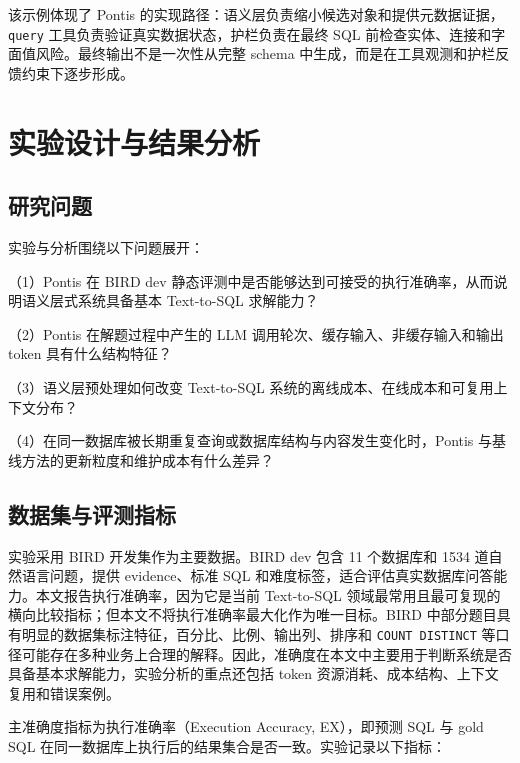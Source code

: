 \documentclass[
    bachelor,
    pdflinks,
]{xjtuthesis}
\begin{document}
该示例体现了 Pontis 的实现路径：语义层负责缩小候选对象和提供元数据证据，\texttt{query} 工具负责验证真实数据状态，护栏负责在最终 SQL 前检查实体、连接和字面值风险。最终输出不是一次性从完整 schema 中生成，而是在工具观测和护栏反馈约束下逐步形成。

\chapter{实验设计与结果分析}

\section{研究问题}

实验与分析围绕以下问题展开：

（1）Pontis 在 BIRD dev 静态评测中是否能够达到可接受的执行准确率，从而说明语义层式系统具备基本 Text-to-SQL 求解能力？

（2）Pontis 在解题过程中产生的 LLM 调用轮次、缓存输入、非缓存输入和输出 token 具有什么结构特征？

（3）语义层预处理如何改变 Text-to-SQL 系统的离线成本、在线成本和可复用上下文分布？

（4）在同一数据库被长期重复查询或数据库结构与内容发生变化时，Pontis 与基线方法的更新粒度和维护成本有什么差异？

\section{数据集与评测指标}

实验采用 BIRD 开发集作为主要数据。BIRD dev 包含 11 个数据库和 1534 道自然语言问题，提供 evidence、标准 SQL 和难度标签，适合评估真实数据库问答能力。本文报告执行准确率，因为它是当前 Text-to-SQL 领域最常用且最可复现的横向比较指标；但本文不将执行准确率最大化作为唯一目标。BIRD 中部分题目具有明显的数据集标注特征，百分比、比例、输出列、排序和 \texttt{COUNT DISTINCT} 等口径可能存在多种业务上合理的解释。因此，准确度在本文中主要用于判断系统是否具备基本求解能力，实验分析的重点还包括 token 资源消耗、成本结构、上下文复用和错误案例。

主准确度指标为执行准确率（Execution Accuracy, EX），即预测 SQL 与 gold SQL 在同一数据库上执行后的结果集合是否一致。实验记录以下指标：
\end{document}
